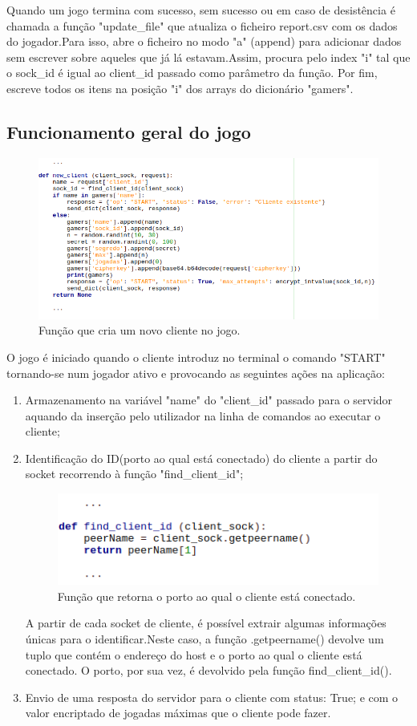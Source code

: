 \documentclass{report}
\begin{document}
Quando um jogo termina com sucesso, sem sucesso ou em caso de desistência é chamada a função "update\_file" que atualiza o ficheiro report.csv com os dados do jogador.Para isso, abre o ficheiro no modo "a" (append) para adicionar dados sem escrever sobre aqueles que já lá estavam.Assim, procura pelo index "i" tal que o sock\_id é igual ao client\_id passado como parâmetro da função. Por fim, escreve todos os itens na posição "i" dos arrays do dicionário "gamers". 

\subsection{Funcionamento geral do jogo}
\begin{figure}[H]
        \centering
        \includegraphics[scale=0.65]{new_client}        
        \caption{Função que cria um novo cliente no jogo.}
\end{figure}
O jogo é iniciado quando o cliente introduz no terminal o comando "START" tornando-se num jogador ativo e provocando as seguintes ações na aplicação:
\begin{enumerate}
\item Armazenamento na variável "name" do "client\_id" passado para o servidor aquando da inserção pelo utilizador na linha de comandos ao executar o cliente;
\item Identificação do ID(porto ao qual está conectado) do cliente a partir do socket recorrendo à função "find\_client\_id";

\begin{figure}[H]
        \centering
        \includegraphics[scale=0.65]{find_client_id}    
        \caption{Função que retorna o porto ao qual o cliente está conectado.}
\end{figure}
A partir de cada socket de cliente, é possível extrair algumas informações únicas para o identificar.Neste caso, a função .getpeername() devolve um tuplo que contém o endereço do host e o porto ao qual o cliente está conectado. O porto, por sua vez, é devolvido pela função find\_client\_id().
        
\item Envio de uma resposta do servidor para o cliente com status: True; e com o valor encriptado de jogadas máximas que o cliente pode fazer.
\end{enumerate}
\end{document}
